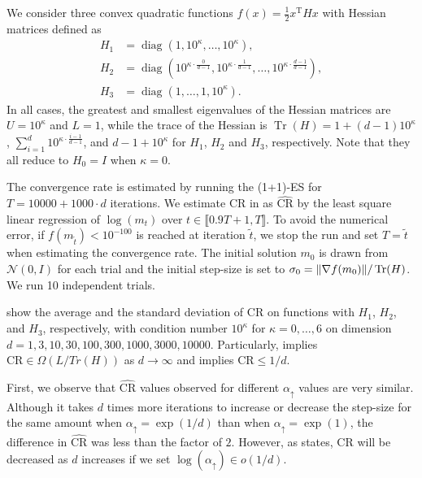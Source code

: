\documentclass[journal]{IEEEtran}
\DeclareMathOperator{\Tr}{Tr}     %
\DeclareMathOperator{\diag}{diag} %
\renewcommand{\leq}{\leqslant} %
\DeclarePairedDelimiter{\norm}{\lVert}{\rVert}
\theoremstyle{definition}
\newcommand{\aup}{\alpha_{\uparrow}}
\begin{document}
We consider three convex quadratic functions $f(x) = \frac{1}{2} x^\mathrm{T} H x$ with Hessian matrices defined as 
\begin{align}
    H_1 &= \diag\left(1, 10^{\kappa}, \dots, 10^{\kappa}\right),
    \\
    H_2 &= \diag\left(10^{\kappa\cdot\frac{0}{d-1}}, 10^{\kappa\cdot\frac{1}{d-1}}, \dots, 10^{\kappa\cdot\frac{d-1}{d-1}}\right),
    \\
    H_3 &= \diag\left(1, \dots, 1, 10^{\kappa}\right).
\end{align}
In all cases, the greatest and smallest eigenvalues of the Hessian matrices are $U = 10^{\kappa}$ and $L = 1$, while the trace of the Hessian is $\Tr(H) = 1 + (d-1)10^{\kappa}$, $\sum_{i=1}^{d} 10^{\kappa \cdot \frac{i-1}{d-1}}$, and $d-1 + 10^{\kappa}$ for $H_1$, $H_2$ and $H_3$, respectively. Note that they all reduce to $H_0 = I$ when $\kappa = 0$.

The convergence rate is estimated by running the (1+1)-ES for $T = 10000 + 1000 \cdot d$ iterations. We estimate $\mathrm{CR}$ in  as $\widehat{\mathrm{CR}}$ by the least square linear regression of $\log(m_t)$ over $t \in \llbracket 0.9 T +1, T\rrbracket$. 
To avoid the numerical error, if $f(m_{\tilde{t}}) < 10^{-100}$ is reached at iteration $\tilde{t}$, we stop the run and set $T = \tilde{t}$ when estimating the convergence rate.
The initial solution $m_0$ is drawn from $\mathcal{N}(0, I)$ for each trial and the initial step-size is set to $\sigma_0 = \norm{\nabla f(m_0)} / \Tr(H)$. 
We run 10 independent trials.

 show the average and the standard deviation of $\widehat{\mathrm{CR}}$ on functions with $H_1$, $H_2$, and $H_3$, respectively, with condition number $10^{\kappa}$ for $\kappa = 0, \dots, 6$ on dimension $d = 1, 3, 10, 30, 100, 300, 1000, 3000, 10000$. 
Particularly,  implies $\mathrm{CR} \in \Omega(L / Tr(H))$ as $d \to \infty$ and  implies $\mathrm{CR} \leq 1/d$. 

First, we observe that $\widehat{\mathrm{CR}}$ values observed for different $\aup$ values are very similar. 
Although it takes $d$ times more iterations to increase or decrease the step-size for the same amount when $\aup = \exp(1/d)$ than when $\aup = \exp(1)$, the difference in $\widehat{\mathrm{CR}}$ was less than the factor of $2$. However, as  states, $\mathrm{CR}$ will be decreased as $d$ increases if we set $\log(\aup) \in o(1/d)$.  
\end{document}
